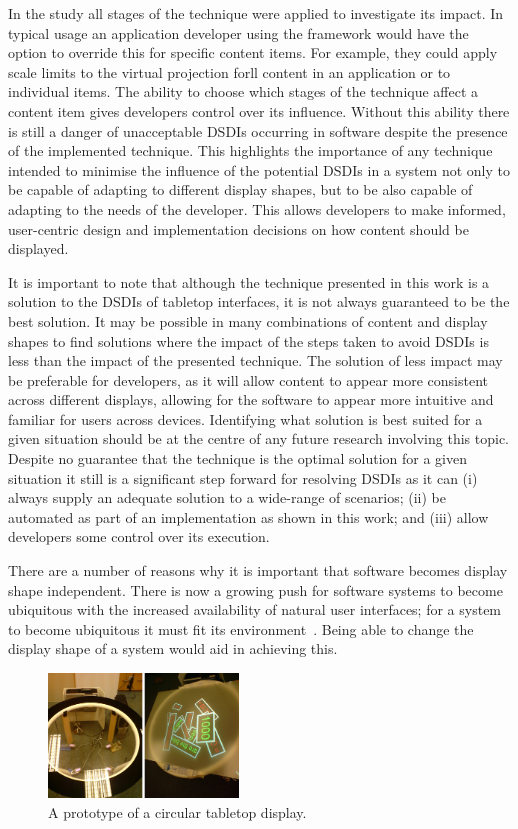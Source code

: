 \documentclass[twocolumn,compsoc]{cvm}
\begin{document}
{In the study all stages of the technique were applied to investigate its impact.
In typical usage an application developer using the framework would have the option to override this for specific content items.
For example, they could apply scale limits to the virtual projection forll content in an application or to individual items.
The ability to choose which stages of the technique affect a content item gives developers control over its influence.
Without this ability there is still a danger of unacceptable \acp{DSDI} occurring in software despite the presence of the implemented technique.
This highlights the importance of any technique intended to minimise the influence of the potential \acp{DSDI} in a system not only to be capable of adapting to different display shapes, but to be also capable of adapting to the needs of the developer. 
This allows developers to make informed, user-centric design and implementation decisions on how content should be displayed.

It is important to note that although the technique presented in this work is a solution to the \acp{DSDI} of tabletop interfaces, it is not always guaranteed to be the best solution.
It may be possible in many combinations of content and display shapes to find solutions where the impact of the steps taken to avoid \acp{DSDI} is less than the impact of the presented technique.
The solution of less impact may be preferable for developers, as it will allow content to appear more consistent across different displays, allowing for the software to appear more intuitive and familiar for users across devices.
Identifying what solution is best suited for a given situation should be at the centre of any future research involving this topic.
Despite no guarantee that the technique is the optimal solution for a given situation it still is a significant step forward for resolving \acp{DSDI} as it can (i) always supply an adequate solution to a wide-range of scenarios; (ii) be automated as part of an implementation as shown in this work; and (iii) allow developers some control over its execution.

There are a number of reasons why it is important that software becomes display shape independent.
There is now a growing push for software systems to become ubiquitous with the increased availability of natural user interfaces; for a system to become ubiquitous it must fit its environment~\cite{Greenfield2006}.
Being able to change the display shape of a system would aid in achieving this.

\begin{figure}[h!]
 \centering
   \includegraphics[width=0.45\textwidth]{figures/PrototypeTabletop.jpeg}
   \caption{A prototype of a circular tabletop display.}
   \label{fig:prototypeTabletop}
\end{figure}

}
\end{document}
